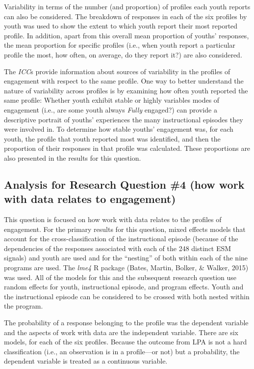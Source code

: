 \documentclass[]{msu-thesis}
\theoremstyle{definition}
\theoremstyle{definition}
\theoremstyle{definition}
\theoremstyle{remark}
\begin{document}
Variability in terms of the number (and proportion) of profiles each
youth reports can also be considered. The breakdown of responses in each
of the six profiles by youth was used to show the extent to which youth
report their most reported profile. In addition, apart from this overall
mean proportion of youths' responses, the mean proportion for specific
profiles (i.e., when youth report a particular profile the most, how
often, on average, do they report it?) are also considered.

The \emph{ICC}s provide information about sources of variability in the
profiles of engagement with respect to the same profile. One way to
better understand the nature of variability across profiles is by
examining how often youth reported the same profile: Whether youth
exhibit stable or highly variables modes of engagement (i.e., are some
youth always \emph{Fully} engaged?) can provide a descriptive portrait
of youths' experiences the many instructional episodes they were
involved in. To determine how stable youths' engagement was, for each
youth, the profile that youth reported most was identified, and then the
proportion of their responses in that profile was calculated. These
proportions are also presented in the results for this question.

\subsection{Analysis for Research Question \#4 (how work with data
relates to
engagement)}\label{analysis-for-research-question-4-how-work-with-data-relates-to-engagement}

This question is focused on how work with data relates to the profiles
of engagement. For the primary results for this question, mixed effects
models that account for the cross-classification of the instructional
episode (because of the dependencies of the responses associated with
each of the 248 distinct ESM signals) and youth are used and for the
``nesting'' of both within each of the nine programs are used. The
\emph{lme4} R package (Bates, Martin, Bolker, \& Walker, 2015) was used.
All of the models for this and the subsequent research question use
random effects for youth, instructional episode, and program effects.
Youth and the instructional episode can be considered to be crossed with
both nested within the program.

The probability of a response belonging to the profile was the dependent
variable and the aspects of work with data are the independent variable.
There are six models, for each of the six profiles. Because the outcome
from LPA is not a hard classification (i.e., an observation is in a
profile---or not) but a probability, the dependent variable is treated
as a continuous variable.
\end{document}
